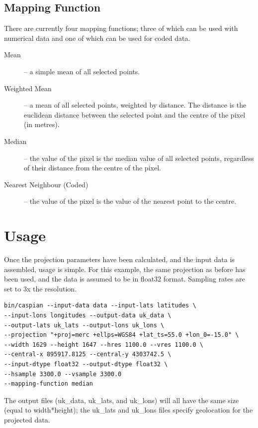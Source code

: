 \documentclass[a4paper,12pt]{article}
\begin{document}
\subsection{Mapping Function}
There are currently four mapping functions; three of which can be used with numerical data and one of which can be used for coded data.
\begin{description}
\item[Mean] -- a simple mean of all selected points.
\item[Weighted Mean] -- a mean of all selected points, weighted by distance. The distance is the euclidean distance between the selected point and the centre of the pixel (in metres).
\item[Median] -- the value of the pixel is the median value of all selected points, regardless of their distance from the centre of the pixel.
\item[Nearest Neighbour (Coded)] -- the value of the pixel is the value of the nearest point to the centre.
\end{description}


\section{Usage}
Once the projection parameters have been calculated, and the input data is assembled, usage is simple. For this example, the same projection as before has been used, and the data is assumed to be in float32 format. Sampling rates are set to 3x the resolution.
\begin{verbatim}
bin/caspian --input-data data --input-lats latitudes \
--input-lons longitudes --output-data uk_data \
--output-lats uk_lats --output-lons uk_lons \
--projection "+proj=merc +ellps=WGS84 +lat_ts=55.0 +lon_0=-15.0" \
--width 1629 --height 1647 --hres 1100.0 --vres 1100.0 \
--central-x 895917.8125 --central-y 4303742.5 \
--input-dtype float32 --output-dtype float32 \
--hsample 3300.0 --vsample 3300.0
--mapping-function median
\end{verbatim}

The output files (uk\_data, uk\_lats, and uk\_lons) will all have the same size (equal to width*height); the uk\_lats and uk\_lons files specify geolocation for the projected data.
\end{document}
